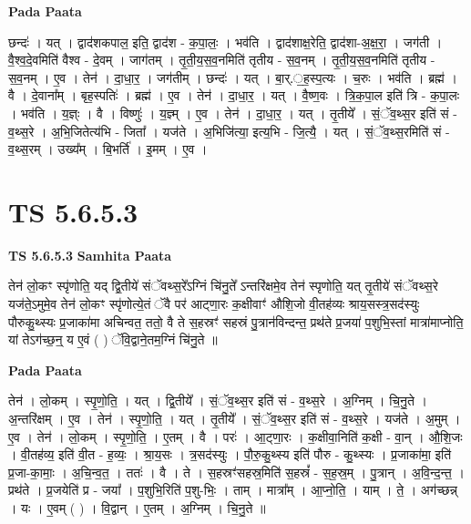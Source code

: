\documentclass[17pt]{extarticle}
\begin{document}
\textbf{Pada Paata} \newline

छन्दः॑ । यत् । द्वाद॑शकपाल॒ इति॒ द्वाद॑श - क॒पा॒लः॒ । भव॑ति । द्वाद॑शाक्ष॒रेति॒ द्वाद॑शा-अ॒क्ष॒रा॒ । जग॑ती । वै॒श्व॒दे॒वमिति॑ वैश्व - दे॒वम् । जाग॑तम् । तृ॒ती॒य॒स॒व॒नमिति॑ तृतीय - स॒व॒नम् । तृ॒ती॒य॒स॒व॒नमिति॑ तृतीय - स॒व॒नम् । ए॒व । तेन॑ । दा॒धा॒र॒ । जग॑तीम् । छन्दः॑ । यत् । बा॒र्.॒ह॒स्प॒त्यः । च॒रुः । भव॑ति । ब्रह्म॑ । वै । दे॒वाना᳚म् । बृह॒स्पतिः॑ । ब्रह्म॑ । ए॒व । तेन॑ । दा॒धा॒र॒ । यत् । वै॒ष्ण॒वः । त्रि॒क॒पा॒ल इति॑ त्रि - क॒पा॒लः । भव॑ति । य॒ज्ञ्ः । वै । विष्णुः॑ । य॒ज्ञ्म् । ए॒व । तेन॑ । दा॒धा॒र॒ । यत् । तृ॒तीये᳚ । सं॒ॅव॒थ्स॒र इति॑ सं - व॒थ्स॒रे । अ॒भि॒जितेत्य॑भि - जिता᳚ । यज॑ते । अ॒भिजि॑त्या॒ इत्य॒भि - जि॒त्यै॒ । यत् । सं॒ॅव॒थ्स॒रमिति॑ सं - व॒थ्स॒रम् । उख्य᳚म् । बि॒भर्ति॑ । इ॒मम् । ए॒व ।  \newline





\section{ TS 5.6.5.3 }

\textbf{TS 5.6.5.3 } \newline
\textbf{Samhita Paata} \newline

तेन॑ लो॒कꣳ स्पृ॑णोति॒ यद् द्वि॒तीये॑ संॅवथ्स॒रे᳚ऽग्निं चि॑नु॒ते᳚ ऽन्तरि॑क्षमे॒व तेन॑ स्पृणोति॒ यत् तृ॒तीये॑ संॅवथ्स॒रे यज॑ते॒ऽमुमे॒व तेन॑ लो॒कꣳ स्पृ॑णोत्ये॒तं ॅवै पर॑ आट्णा॒रः क॒क्षीवाꣳ॑ औशि॒जो वी॒तह॑व्यः श्राय॒सस्त्र॒सद॑स्युः पौरुकु॒थ्स्यः प्र॒जाका॑मा अचिन्वत॒ ततो॒ वै ते स॒हस्रꣳ॑ सहस्रं पु॒त्रान॑विन्दन्त॒ प्रथ॑ते प्र॒जया॑ प॒शुभि॒स्तां मात्रा॑माप्नोति॒ यां तेऽग॑च्छ॒न्॒ य ए॒वं ( ) ॅवि॒द्वाने॒तम॒ग्निं चि॑नु॒ते ॥ \newline

\textbf{Pada Paata} \newline

तेन॑ । लो॒कम् । स्पृ॒णो॒ति॒ । यत् । द्वि॒तीये᳚ । सं॒ॅव॒थ्स॒र इति॑ सं - व॒थ्स॒रे । अ॒ग्निम् । चि॒नु॒ते । अ॒न्तरि॑क्षम् । ए॒व । तेन॑ । स्पृ॒णो॒ति॒ । यत् । तृ॒तीये᳚ । सं॒ॅव॒थ्स॒र इति॑ सं - व॒थ्स॒रे । यज॑ते । अ॒मुम् । ए॒व । तेन॑ । लो॒कम् । स्पृ॒णो॒ति॒ । ए॒तम् । वै । परः॑ । आ॒ट्णा॒रः । क॒क्षीवा॒निति॑ क॒क्षी - वा॒न् । औ॒शि॒जः । वी॒तह॑व्य॒ इति॑ वी॒त - ह॒व्यः॒ । श्रा॒य॒सः । त्र॒सद॑स्युः । पौ॒रु॒कु॒थ्स्य इति॑ पौरु - कु॒थ्स्यः । प्र॒जाका॑मा॒ इति॑ प्र॒जा-का॒माः॒ । अ॒चि॒न्व॒त॒ । ततः॑ । वै । ते । स॒हस्रꣳ॑सहस्र॒मिति॑ स॒हस्रं᳚ - स॒ह॒स्र॒म् । पु॒त्रान् । अ॒वि॒न्द॒न्त॒ । प्रथ॑ते । प्र॒जयेति॑ प्र - जया᳚ । प॒शुभि॒रिति॑ प॒शु-भिः॒ । ताम् । मात्रा᳚म् । आ॒प्नो॒ति॒ । याम् । ते॒ । अग॑च्छन्न् । यः । ए॒वम् ( ) । वि॒द्वान् । ए॒तम् । अ॒ग्निम् । चि॒नु॒ते ॥  \newline
\end{document}
